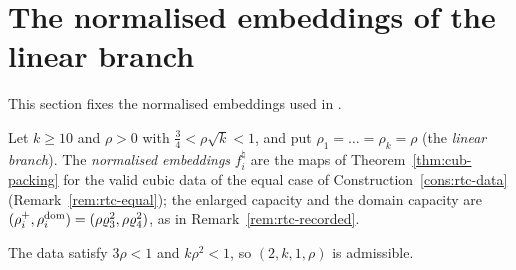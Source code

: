 \section{The normalised embeddings of the linear branch}\label{sec:brd}

This section fixes the normalised embeddings used in .

\begin{construction}\label{cons:ham-branch}
Let $k\ge10$ and $\rho>0$ with $\frac34<\rho\sqrt k<1$, and put $\rho_1=\dots=\rho_k=\rho$ (the \emph{linear branch}).
The \emph{normalised embeddings} $f^\natural_i$ are the maps of Theorem~\ref{thm:cub-packing} for the valid cubic data of
the equal case of Construction~\ref{cons:rtc-data} (Remark~\ref{rem:rtc-equal}); the enlarged capacity and the domain
capacity are $(\rho_i^+,\rho_i^{\rm dom})=(\rho \varrho_3^2,\rho \varrho_4^2)$, as in Remark~\ref{rem:rtc-recorded}.
\end{construction}

The data satisfy $3\rho<1$ and $k\rho^2<1$, so $(2,k,1,\rho)$ is admissible.
